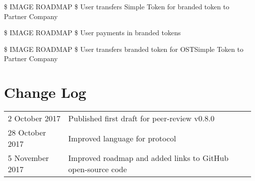 \documentclass[12pt,a4paper, twocolumn]{article}
\begin{document}
\$ IMAGE ROADMAP \$
User transfers Simple Token for branded token to Partner Company

\$ IMAGE ROADMAP \$
User payments in branded tokens

\$ IMAGE ROADMAP \$
User transfers branded token for OSTSimple Token to Partner Company


\section{Change Log}
\begin{table}[H]
\centering
\label{Appendix}
\begin{tabular}{lll}
2 October 2017  & Published first draft for peer-review v0.8.0    \\

28 October 2017 & Improved language for protocol   \\
5 November 2017 & Improved roadmap and added links to GitHub open-source code\\
\end{tabular}
\end{table}
\end{document}
